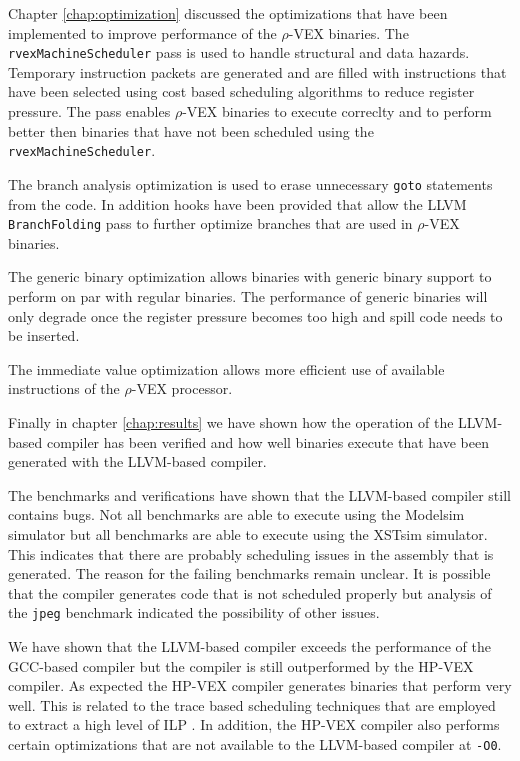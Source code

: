Chapter \ref{chap:optimization} discussed the optimizations that have been implemented to improve performance of the $\rho$-VEX binaries. The \texttt{rvexMachineScheduler} pass is used to handle structural and data hazards. Temporary instruction packets are generated and are filled with instructions that have been selected using cost based scheduling algorithms to reduce register pressure. The pass enables $\rho$-VEX binaries to execute correclty and to perform better then binaries that have not been scheduled using the \texttt{rvexMachineScheduler}.

The branch analysis optimization is used to erase unnecessary \texttt{goto} statements from the code. In addition hooks have been provided that allow the LLVM \texttt{BranchFolding} pass to further optimize branches that are used in $\rho$-VEX binaries.

The generic binary optimization allows binaries with generic binary support to perform on par with regular binaries. The performance of generic binaries will only degrade once the register pressure becomes too high and spill code needs to be inserted.

The immediate value optimization allows more efficient use of available instructions of the  $\rho$-VEX processor.

Finally in chapter \ref{chap:results} we have shown how the operation of the LLVM-based compiler has been verified and how well binaries execute that have been generated with the LLVM-based compiler.


The benchmarks and verifications have shown that the LLVM-based compiler still contains bugs. Not all benchmarks are able to execute using the Modelsim simulator but all benchmarks are able to execute using the XSTsim simulator. This indicates that there are probably scheduling issues in the assembly that is generated. The reason for the failing benchmarks remain unclear. It is possible that the compiler generates code that is not scheduled properly but analysis of the \texttt{jpeg} benchmark indicated the possibility of other issues. 

We have shown that the LLVM-based compiler exceeds the performance of the GCC-based compiler but the compiler is still outperformed by the HP-VEX compiler. As expected the HP-VEX compiler generates binaries that perform very well. This is related to the trace based scheduling techniques that are employed to extract a high level of ILP \cite{Lowney:1993qy}. In addition, the HP-VEX compiler also performs certain optimizations that are not available to the LLVM-based compiler at \texttt{-O0}.

